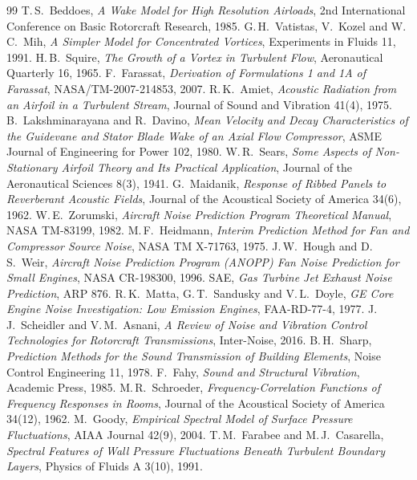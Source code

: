 \documentclass[10pt,a4paper,twocolumn]{article}
\begin{document}
\begin{thebibliography}{99}
 T.\,S.\ Beddoes, \emph{A Wake Model for High Resolution Airloads}, 2nd International Conference on Basic Rotorcraft Research, 1985.
 G.\,H.\ Vatistas, V.\ Kozel and W.\,C.\ Mih, \emph{A Simpler Model for Concentrated Vortices}, Experiments in Fluids 11, 1991.
 H.\,B.\ Squire, \emph{The Growth of a Vortex in Turbulent Flow}, Aeronautical Quarterly 16, 1965.
 F.\ Farassat, \emph{Derivation of Formulations 1 and 1A of Farassat}, NASA/TM-2007-214853, 2007.
 R.\,K.\ Amiet, \emph{Acoustic Radiation from an Airfoil in a Turbulent Stream}, Journal of Sound and Vibration 41(4), 1975.
 B.\ Lakshminarayana and R.\ Davino, \emph{Mean Velocity and Decay Characteristics of the Guidevane and Stator Blade Wake of an Axial Flow Compressor}, ASME Journal of Engineering for Power 102, 1980.
 W.\,R.\ Sears, \emph{Some Aspects of Non-Stationary Airfoil Theory and Its Practical Application}, Journal of the Aeronautical Sciences 8(3), 1941.
 G.\ Maidanik, \emph{Response of Ribbed Panels to Reverberant Acoustic Fields}, Journal of the Acoustical Society of America 34(6), 1962.
 W.\,E.\ Zorumski, \emph{Aircraft Noise Prediction Program Theoretical Manual}, NASA TM-83199, 1982.
 M.\,F.\ Heidmann, \emph{Interim Prediction Method for Fan and Compressor Source Noise}, NASA TM X-71763, 1975.
 J.\,W.\ Hough and D.\,S.\ Weir, \emph{Aircraft Noise Prediction Program (ANOPP) Fan Noise Prediction for Small Engines}, NASA CR-198300, 1996.
 SAE, \emph{Gas Turbine Jet Exhaust Noise Prediction}, ARP 876.
 R.\,K.\ Matta, G.\,T.\ Sandusky and V.\,L.\ Doyle, \emph{GE Core Engine Noise Investigation: Low Emission Engines}, FAA-RD-77-4, 1977.
 J.\,J.\ Scheidler and V.\,M.\ Asnani, \emph{A Review of Noise and Vibration Control Technologies for Rotorcraft Transmissions}, Inter-Noise, 2016.
 B.\,H.\ Sharp, \emph{Prediction Methods for the Sound Transmission of Building Elements}, Noise Control Engineering 11, 1978.
 F.\ Fahy, \emph{Sound and Structural Vibration}, Academic Press, 1985.
 M.\,R.\ Schroeder, \emph{Frequency-Correlation Functions of Frequency Responses in Rooms}, Journal of the Acoustical Society of America 34(12), 1962.
 M.\ Goody, \emph{Empirical Spectral Model of Surface Pressure Fluctuations}, AIAA Journal 42(9), 2004.
 T.\,M.\ Farabee and M.\,J.\ Casarella, \emph{Spectral Features of Wall Pressure Fluctuations Beneath Turbulent Boundary Layers}, Physics of Fluids A 3(10), 1991.

\end{thebibliography}
\end{document}
